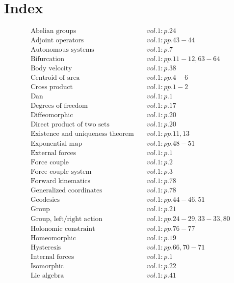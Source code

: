 \documentclass[a4paper]{article}
\begin{document}
 
\section*{Index} 
\allowdisplaybreaks 
\begin{align*} 
&\text{Abelian groups} \;&& vol. 1: p. 24\\
&\text{Adjoint operators} \;&& vol. 1: pp. 43-44\\
&\text{Autonomous systems} \;&& vol. 1: p. 7\\
&\text{Bifurcation} \;&& vol. 1: pp. 11-12, 63-64\\
&\text{Body velocity} \;&& vol. 1: p. 38\\
&\text{Centroid of area} \;&& vol. 1: pp. 4-6\\
&\text{Cross product} \;&& vol. 1: pp. 1-2\\
&\text{Dan} \;&& vol. 1: p. 1\\
&\text{Degrees of freedom} \;&& vol. 1: p. 17\\
&\text{Diffeomorphic} \;&& vol. 1: p. 20\\
&\text{Direct product of two sets} \;&& vol. 1: p. 20\\
&\text{Existence and uniqueness theorem} \;&& vol. 1: pp. 11, 13\\
&\text{Exponential map} \;&& vol. 1: pp. 48-51\\
&\text{External forces} \;&& vol. 1: p. 1\\
&\text{Force couple} \;&& vol. 1: p. 2\\
&\text{Force couple system} \;&& vol. 1: p. 3\\
&\text{Forward kinematics} \;&& vol. 1: p. 78\\
&\text{Generalized coordinates} \;&& vol. 1: p. 78\\
&\text{Geodesics} \;&& vol. 1: pp. 44-46, 51\\
&\text{Group} \;&& vol. 1: p. 21\\
&\text{Group, left/right action} \;&& vol. 1: pp. 24-29, 33-33, 80\\
&\text{Holonomic constraint} \;&& vol. 1: pp. 76-77\\
&\text{Homeomorphic} \;&& vol. 1: p. 19\\
&\text{Hysteresis} \;&& vol. 1: pp. 66, 70-71\\
&\text{Internal forces} \;&& vol. 1: p. 1\\
&\text{Isomorphic} \;&& vol. 1: p. 22\\
&\text{Lie algebra} \;&& vol. 1: p. 41\\

\end{align*}
\end{document}
